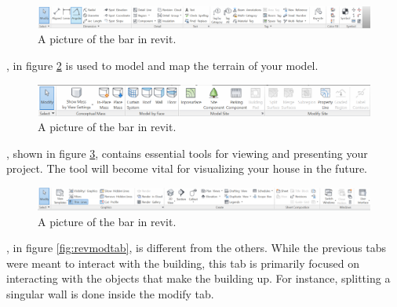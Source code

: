 \documentclass{tufte-book} %
\begin{document}
\begin{figure}
	\includegraphics[width=\linewidth]{revitannotationbar.png}
	\caption[The annotation bar]{A picture of the  bar in revit.}
	\label{fig:revanntab}
\end{figure}



, in figure \ref{fig:revmastab} is used to model and map the terrain of your model.

\begin{figure}
	\includegraphics[width=\linewidth]{revitmassingsitebar.png}
	\caption[The massing and site bar]{A picture of the  bar in revit.}
	\label{fig:revmastab}
\end{figure}


, shown in figure \ref{fig:revviewtab}, contains essential tools for viewing and presenting your project. The \mbox{} tool will become vital for visualizing your house in the future.


\begin{figure}
	\includegraphics[width=\linewidth]{revitviewtab.png}
	\caption[The view bar]{A picture of the  bar in revit.}
	\label{fig:revviewtab}
\end{figure}

, in figure \ref{fig:revmodtab}, is different from the others. While the previous tabs were meant to interact with the building, this tab is primarily focused on interacting with the objects that make the building up. For instance, splitting a singular wall is done inside the modify tab.
\end{document}
